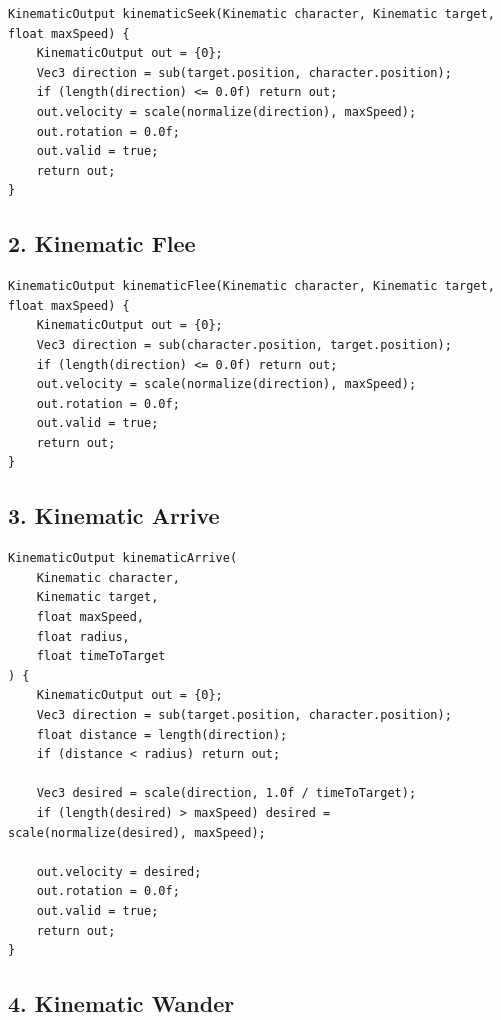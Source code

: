 \documentclass[10pt,letterpaper]{article}
\begin{document}
\begin{verbatim}
KinematicOutput kinematicSeek(Kinematic character, Kinematic target, float maxSpeed) {
    KinematicOutput out = {0};
    Vec3 direction = sub(target.position, character.position);
    if (length(direction) <= 0.0f) return out;
    out.velocity = scale(normalize(direction), maxSpeed);
    out.rotation = 0.0f;
    out.valid = true;
    return out;
}
\end{verbatim}

\subsection*{2. Kinematic Flee}
{}

\begin{verbatim}
KinematicOutput kinematicFlee(Kinematic character, Kinematic target, float maxSpeed) {
    KinematicOutput out = {0};
    Vec3 direction = sub(character.position, target.position);
    if (length(direction) <= 0.0f) return out;
    out.velocity = scale(normalize(direction), maxSpeed);
    out.rotation = 0.0f;
    out.valid = true;
    return out;
}
\end{verbatim}

\subsection*{3. Kinematic Arrive}
{}

\begin{verbatim}
KinematicOutput kinematicArrive(
    Kinematic character,
    Kinematic target,
    float maxSpeed,
    float radius,
    float timeToTarget
) {
    KinematicOutput out = {0};
    Vec3 direction = sub(target.position, character.position);
    float distance = length(direction);
    if (distance < radius) return out;

    Vec3 desired = scale(direction, 1.0f / timeToTarget);
    if (length(desired) > maxSpeed) desired = scale(normalize(desired), maxSpeed);

    out.velocity = desired;
    out.rotation = 0.0f;
    out.valid = true;
    return out;
}
\end{verbatim}

\subsection*{4. Kinematic Wander}
{}
\end{document}
